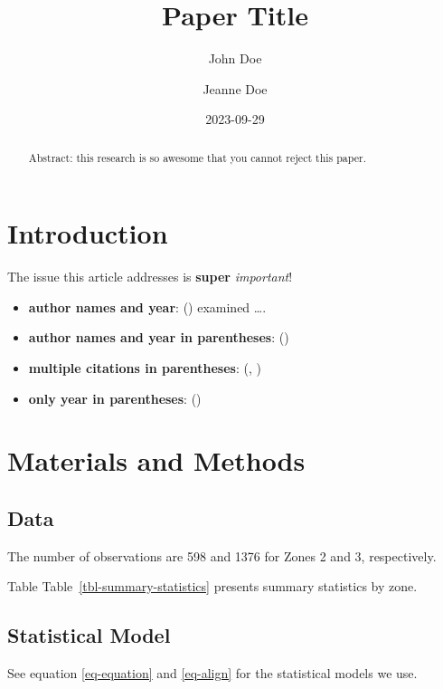 \documentclass[
]{article}
\title{Paper Title}
\author{John Doe}
\affil{%
                  Deadliest University
              }
\author{Jeanne Doe}
\affil{%
                  Random University
              }
\date{2023-09-29}
\begin{document}
\maketitle
\begin{abstract}
Abstract: this research is so awesome that you cannot reject this paper.
\end{abstract}
\newpage

\section{Introduction}\label{introduction}

The issue this article addresses is \textbf{super} \emph{important}!

\begin{itemize}
\item
  \textbf{author names and year}:
  () examined \ldots.
\item
  \textbf{author names and year in parentheses}:
  ()
\item
  \textbf{multiple citations in parentheses}:
  (,
  )
\item
  \textbf{only year in parentheses}:
  ()
\end{itemize}

\newpage

\section{Materials and Methods}\label{materials-and-methods}

\subsection{Data}\label{data}

The number of observations are 598 and 1376 for Zones 2 and 3,
respectively.

Table Table~\ref{tbl-summary-statistics} presents summary statistics by
zone.

\subsection{Statistical Model}\label{statistical-model}

See equation \ref{eq-equation} and \ref{eq-align} for the statistical
models we use.
\end{document}
